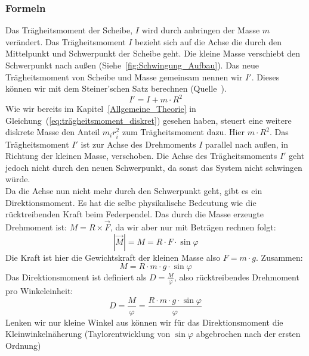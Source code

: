 \documentclass{article}
\begin{document}
			\subsubsection{Formeln}
				Das Trägheitsmoment der Scheibe, \(I\) wird durch anbringen der Masse \(m\) verändert.
				Das Trägheits\-moment \(I\) bezieht sich auf die Achse die durch den Mittelpunkt und Schwerpunkt der Scheibe geht.
				Die kleine Masse verschiebt den Schwerpunkt nach außen (Siehe~\ref{fig:Schwingung_Aufbau}).
				Das neue Trägheitsmoment von Scheibe und Masse gemeinsam nennen wir \(I'\). Dieses können wir mit dem Steiner'schen Satz berechnen (Quelle~\cite{ExPhy1}).
				\begin{equation}\label{eq:Neues_Trägheismoment}
					I' = I + m \cdot R^2
				\end{equation}
				Wie wir bereits im Kapitel~\ref{Allgemeine_Theorie} in Gleichung~(\ref{eq:trägheitsmoment_diskret}) gesehen haben, steuert eine weitere diskrete Masse den Anteil \( m_i r_i^2\)
				zum Trägheitsmoment dazu. Hier \( m \cdot R^2\).
				Das Trägheitsmoment \(I'\) ist zur Achse des Drehmoments \(I\) parallel nach außen, in Richtung der kleinen Masse, verschoben.
				Die Achse des Trägheitsmoments \(I'\) geht jedoch nicht durch den neuen Schwerpunkt, da sonst das System nicht schwingen würde. \\ %
				Da die Achse nun nicht mehr durch den Schwerpunkt geht, gibt es ein Direktionsmoment. Es hat die selbe physikalische Bedeutung wie die rücktreibenden Kraft beim Federpendel.
				Das durch die Masse erzeugte Drehmoment ist: \(M = R \times \vec{F}\), da wir aber nur mit Beträgen rechnen folgt:
				\begin{equation}
					|\vec{M}| = M = R \cdot F \cdot \sin \varphi
				\end{equation}
				Die Kraft ist hier die Gewichtskraft der kleinen Masse also \(F = m \cdot g\). Zusammen:
				\begin{equation}
					M = R \cdot m \cdot g \cdot \sin \varphi
				\end{equation}
				Das Direktionsmoment ist definiert als \(D = \frac{M}{\varphi}\), also rücktreibendes Drehmoment pro Winkeleinheit:
				\begin{equation}
					D = \frac{M}{\varphi} = \frac{ R \cdot m \cdot g \cdot \sin \varphi }{ \varphi }
				\end{equation}
				Lenken wir nur kleine Winkel aus können wir für das Direktionsmoment die Kleinwinkelnäherung (Taylorentwicklung von \( \sin \varphi \) abgebrochen nach der ersten Ordnung)
\end{document}
